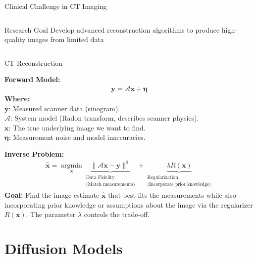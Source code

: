 \documentclass[10pt]{beamer}
\newcommand{\vect}[1]{\bm{#1}}
\newcommand{\op}[1]{\mathcal{#1}}
\begin{document}
\begin{frame}{Clinical Challenge in CT Imaging}
\begin{columns}[T]
\begin{column}{0.4\textwidth}
      \begin{alertblock}{Research Goal}
        Develop advanced reconstruction algorithms to produce high-quality images from limited data
      \end{alertblock}
    \end{column}
  \end{columns}
\end{frame}

\begin{frame}{CT Reconstruction}

  \textbf{Forward Model:}
  \begin{align*}
    \vect{y} = \op{A}\vect{x} + \vect{\eta}
  \end{align*}
  \footnotesize
  \textbf{Where:} \\
  $\vect{y}$: Measured scanner data (sinogram). \\
  $\op{A}$: System model (Radon transform, describes scanner physics). \\
  $\vect{x}$: The true underlying image we want to find. \\
  $\vect{\eta}$: Measurement noise and model inaccuracies.
  \normalsize

  \bigskip

  \textbf{Inverse Problem:}
  \begin{align*}
       \hat{\vect{x}} = \operatorname*{argmin}_{\vect{x}} \underbrace{\|\op{A}\vect{x} - \vect{y}\|^2}_{\substack{\text{Data Fidelity}\\\text{(Match measurements)}}} + \underbrace{\lambda R(\vect{x})}_{\substack{\text{Regularization}\\\text{(Incorporate prior knowledge)}}}
  \end{align*}
  \footnotesize
  \textbf{Goal:} Find the image estimate $\hat{\vect{x}}$ that best fits the measurements while also incorporating prior knowledge or assumptions about the image via the regularizer $R(\vect{x})$. The parameter $\lambda$ controls the trade-off.
  \normalsize

\end{frame}

\section{Diffusion Models}
\end{document}
